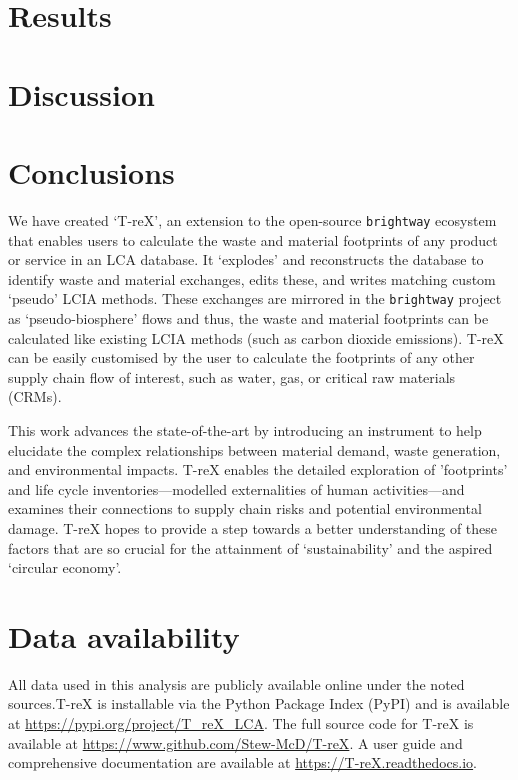 \documentclass[review,3p,authoryear]{elsarticle}
\renewcommand{\texttt}[1]{{\ttfamily\small\nolinkurl{#1}}}
\newcommand{\cbox}[1]{
    \begin{tcolorbox}[hbox, colback=red!5!white, colframe=red!65!black, boxrule=0.25pt, boxsep=2pt, left=2pt, right=2pt, top=1pt, bottom=1pt]
        \small\sffamily #1
    \end{tcolorbox}
    }
\begin{document}
\section{Results}\label{sec:results}


\section{Discussion}\label{sec:discussion}


\section{Conclusions}\label{sec:conclusions}

We have created `T-reX', an extension to the open-source \texttt{brightway} ecosystem that enables users to calculate the waste and material footprints of any product or service in an LCA database. It `explodes' and reconstructs the database to identify waste and material exchanges, edits these, and writes matching custom `pseudo' LCIA methods. These exchanges are mirrored in the \texttt{brightway} project as `pseudo-biosphere' flows and thus, the waste and material footprints can be calculated like existing LCIA methods (such as carbon dioxide emissions). T-reX can be easily customised by the user to calculate the footprints of any other supply chain flow of interest, such as water, gas, or critical raw materials (CRMs).

This work advances the state-of-the-art by introducing an instrument to help elucidate the complex relationships between material demand, waste generation, and environmental impacts. T-reX enables the detailed exploration of 'footprints' and life cycle inventories---modelled externalities of human activities---and examines their connections to supply chain risks and potential environmental damage. T-reX hopes to provide a step towards a better understanding of these factors that are so crucial for the attainment of `sustainability' and the aspired `circular economy'.

\section*{Data availability}
All data used in this analysis are publicly available online under the noted sources.T-reX is installable via the Python Package Index (PyPI) and is available at \url{https://pypi.org/project/T_reX_LCA}.
The full source code for T-reX is available at \url{https://www.github.com/Stew-McD/T-reX}.
A user guide and comprehensive documentation are available at \url{https://T-reX.readthedocs.io}.
\end{document}
